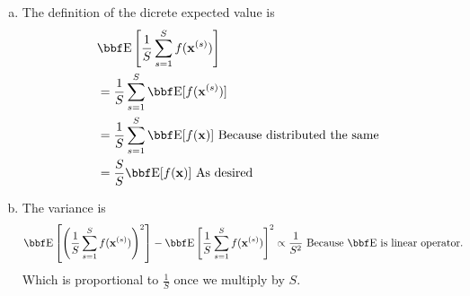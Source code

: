 \documentclass[12pt,letterpaper,fleqn]{hmcpset}
\begin{document}
\begin{solution}
	\begin{enumerate}[(a)]
		\item 
			The definition of the dicrete expected value is
			\begin{align*}
				& \EE \left[\frac1S \sum_{s=1}^S f(\xx^{(s)}) \right] \\
				&= \frac1S \sum_{s=1}^S \EE [f(\xx^{(s)})] \\
				&= \frac1S \sum_{s=1}^S \EE [f(\xx)] \text{ Because distributed the same} \\
				&= \frac{S}{S} \EE [f(\xx)] \text{ As desired}
			\end{align*}
		\item
			The variance is 
			\begin{align*}
				\EE \left[ \left(\frac1S \sum_{s=1}^S f(\xx^{(s)})\right)^2 \right]- \EE \left[\frac1S \sum_{s=1}^S f(\xx^{(s)}) \right]^2
				&\propto \frac{1}{S^2} \text{ Because $\EE$ is linear operator.}
			\end{align*}
			Which is proportional to $\frac1S$ once we multiply by $S$.
	\end{enumerate}
\end{solution}
\end{document}
